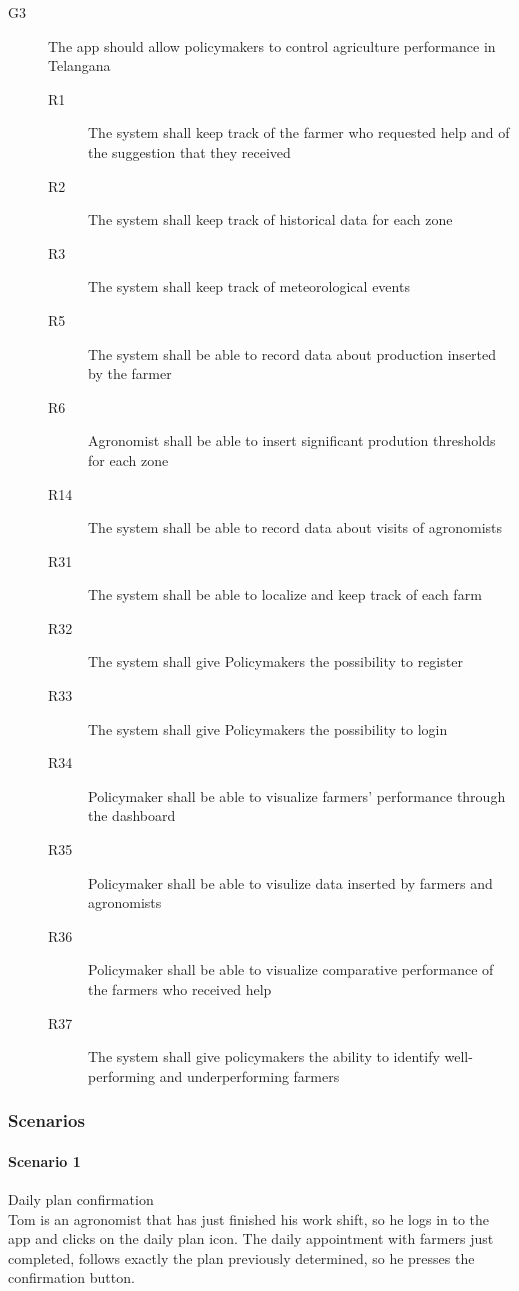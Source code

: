 \begin{description}
\begin{description}
        \end{description}
    \item [G3] The app should allow policymakers to control agriculture performance in Telangana
        \begin{description}
            \item[R1] The system shall keep track of the farmer who requested help and of the suggestion that they received
            \item[R2] The system shall keep track of historical data for each zone
            \item[R3] The system shall keep track of meteorological events
            \item[R5] The system shall be able to record data about production inserted by the farmer
            \item[R6] Agronomist shall be able to insert significant prodution thresholds for each zone   
            \item[R14] The system shall be able to record data about visits of agronomists
            \item[R31] The system shall be able to localize and keep track of each farm  
            \item[R32] The system shall give Policymakers the possibility to register 
            \item[R33] The system shall give Policymakers the possibility to login
            \item[R34] Policymaker shall be able to visualize farmers' performance through the dashboard
            \item[R35] Policymaker shall be able to visulize data inserted by farmers and agronomists
            \item[R36] Policymaker shall be able to visualize comparative performance of the farmers who received help
            \item[R37] The system shall give policymakers the ability to identify well-performing and underperforming farmers    
        \end{description}
\end{description}


\bigskip
\subsubsection{Scenarios}
\paragraph{Scenario 1} Daily plan confirmation\\
Tom is an agronomist that has just finished his work shift, so he logs in to the app and clicks on the daily plan icon.
The daily appointment with farmers just completed, follows exactly the plan previously determined, so he presses the
confirmation button.

